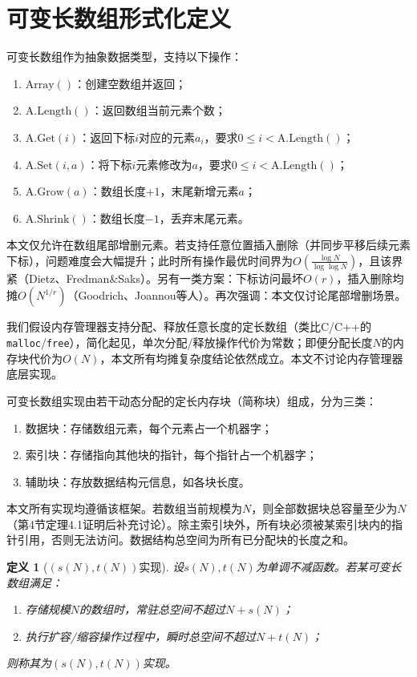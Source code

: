 \documentclass[11pt,a4paper]{article}
\newtheorem{defi}{定义}[section]
\begin{document}
\section{可变长数组形式化定义}
可变长数组作为抽象数据类型，支持以下操作：
\begin{enumerate}
    \item $\text{Array}()$：创建空数组并返回；
    \item $\text{A.Length}()$：返回数组当前元素个数；
    \item $\text{A.Get}(i)$：返回下标$i$对应的元素$a_i$，要求$0\le i<\text{A.Length}()$；
    \item $\text{A.Set}(i,a)$：将下标$i$元素修改为$a$，要求$0\le i<\text{A.Length}()$；
    \item $\text{A.Grow}(a)$：数组长度$+1$，末尾新增元素$a$；
    \item $\text{A.Shrink}()$：数组长度$-1$，丢弃末尾元素。
\end{enumerate}

本文仅允许在数组尾部增删元素。若支持任意位置插入删除（并同步平移后续元素下标），问题难度会大幅提升；此时所有操作最优时间界为$O(\frac{\log N}{\log\log N})$，且该界紧（Dietz、Fredman\&Saks）。另有一类方案：下标访问最坏$O(r)$，插入删除均摊$O(N^{1/r})$（Goodrich、Joannou等人）。再次强调：本文仅讨论尾部增删场景。

我们假设内存管理器支持分配、释放任意长度的定长数组（类比C/C++的\texttt{malloc}/\texttt{free}），简化起见，单次分配/释放操作代价为常数；即便分配长度$N$的内存块代价为$O(N)$，本文所有均摊复杂度结论依然成立。本文不讨论内存管理器底层实现。

可变长数组实现由若干动态分配的定长内存块（简称块）组成，分为三类：
\begin{enumerate}
    \item 数据块：存储数组元素，每个元素占一个机器字；
    \item 索引块：存储指向其他块的指针，每个指针占一个机器字；
    \item 辅助块：存放数据结构元信息，如各块长度。
\end{enumerate}

本文所有实现均遵循该框架。若数组当前规模为$N$，则全部数据块总容量至少为$N$（第4节定理4.1证明后补充讨论）。除主索引块外，所有块必须被某索引块内的指针引用，否则无法访问。数据结构总空间为所有已分配块的长度之和。

\begin{defi}[$(s(N),t(N))$实现]
设$s(N),t(N)$为单调不减函数。若某可变长数组满足：
\begin{enumerate}
    \item 存储规模$N$的数组时，常驻总空间不超过$N+s(N)$；
    \item 执行扩容/缩容操作过程中，瞬时总空间不超过$N+t(N)$；
\end{enumerate}
则称其为$(s(N),t(N))$实现。
\end{defi}
\end{document}
